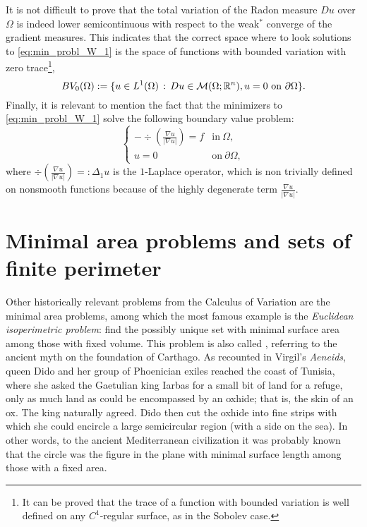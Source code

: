It is not difficult to prove that the total variation of the Radon measure $Du$ over $\Omega$ is indeed lower semicontinuous with respect to the weak$^*$ converge of the gradient measures. This indicates that the correct space where to look solutions to \eqref{eq:min_probl_W_1} is the space of functions with bounded variation with zero trace\footnote{It can be proved that the trace of a function with bounded variation is well defined on any $C^{1}$-regular surface, as in the Sobolev case.}, 
\begin{equation*}
BV_{0}(\Omega) := \{ u \in L^{1}(\Omega) \, : \, Du \in \mathcal{M}(\Omega; \mathbb{R}^{n}), u = 0 \ \text{on} \ \partial \Omega \}.
\end{equation*}
Finally, it is relevant to mention the fact that the minimizers to \eqref{eq:min_probl_W_1} solve the following boundary value problem:
\begin{equation*}
\begin{cases} 
- \div \left ( \frac{\nabla u}{|\nabla u|} \right ) = f & \text{in} \ \Omega, \\
u = 0 & \text{on} \ \partial \Omega,
\end{cases}
\end{equation*}
where $\div \left ( \frac{\nabla u}{|\nabla u|} \right ) =: \Delta_{1}u$ is the $1$-Laplace operator, which is non trivially defined on nonsmooth functions because of the highly degenerate term $\frac{\nabla u}{|\nabla u|}$.

\section*{Minimal area problems and sets of finite perimeter}

Other historically relevant problems from the Calculus of Variation are the minimal area problems, among which the most famous example is the \emph{Euclidean isoperimetric problem}: find the possibly unique set with minimal surface area among those with fixed volume. This problem is also called , referring to the ancient myth on the foundation of Carthago. As recounted in Virgil's {\em Aeneids}, queen Dido and her group of Phoenician exiles reached the coast of Tunisia, where she asked the Gaetulian king Iarbas for a small bit of land for a refuge, only as much land as could be encompassed by an oxhide; that is, the skin of an ox. The king naturally agreed. Dido then cut the oxhide into fine strips with which she could encircle a large semicircular region (with a side on the sea). In other words, to the ancient Mediterranean civilization it was probably known that the circle was the figure in the plane with minimal surface length among those with a fixed area. 

